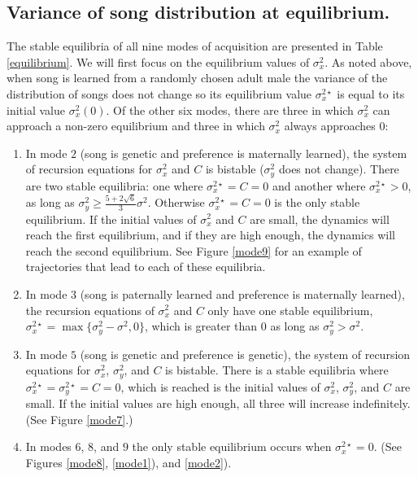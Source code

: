 \documentclass{article}
\begin{document}
\subsection*{Variance of song distribution at equilibrium. }
The stable equilibria of all nine modes of acquisition are presented in Table \ref{equilibrium}. We will first focus on the equilibrium values of $\sigma_x^2$. As noted above, when song is learned from a randomly chosen adult male the variance of the distribution of songs does not change so its equilibrium value $\sigma_x^{2\star}$ is equal to its initial value $\sigma_x^2(0)$. Of the other six modes, there are three in which $\sigma_x^2$ can approach a non-zero equilibrium and three in which $\sigma_x^2$ always approaches $0$:
\begin{enumerate}
\item
In mode $2$ (song is genetic and preference is maternally learned), the system of recursion equations for $\sigma_x^2$ and $C$ is bistable ($\sigma_y^2$ does not change). There are two stable equilibria: one where $\sigma_x^{2\star}=C=0$ and another where $\sigma_x^{2\star}>0$, as long as $\sigma_y^2\geq\frac{5+2\sqrt{6}}{3}\sigma^2$. Otherwise $\sigma_x^{2\star}=C=0$ is the only stable equilibrium. If the initial values of $\sigma_x^2$ and $C$ are small, the dynamics will reach the first equilibrium, and if they are high enough, the dynamics will reach the second equilibrium. See Figure \ref{mode9} for an example of trajectories that lead to each of these equilibria. 
\item In mode $3$ (song is paternally learned and preference is maternally learned), the recursion equations of $\sigma_x^2$ and $C$ only have one stable equilibrium, $\sigma_x^{2\star}=\max\{\sigma_y^2-\sigma^2,0\}$, which is greater than $0$ as long as $\sigma_y^2>\sigma^2$.
\item In mode $5$ (song is genetic and preference is genetic), the system of recursion equations for $\sigma_x^2$, $\sigma_y^2$, and $C$ is bistable. There is a stable equilibria where $\sigma_x^{2\star}=\sigma_y^{2\star}=C=0$, which is reached is the initial values of $\sigma_x^2$, $\sigma_y^2$, and $C$ are small. If the initial values are high enough, all three will increase indefinitely. (See Figure \ref{mode7}.)
\item In modes $6$, $8$, and $9$ the only stable equilibrium occurs when $\sigma_x^{2\star}=0$. (See Figures \ref{mode8}, \ref{mode1}), and \ref{mode2}). 
\end{enumerate}
\end{document}
